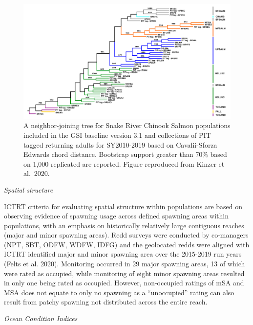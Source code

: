\documentclass[
  letterpaper,
  oneside,
  open=any]{scrbook}
\begin{document}
\begin{figure}

{\centering \includegraphics[width=7.88in,height=\textheight]{content/Interior_Columbia/../../media/image24.png}

}

\caption{\label{fig-SnR-SS-neighbor-joining-tree}A neighbor-joining tree
for Snake River Chinook Salmon populations included in the GSI baseline
version 3.1 and collections of PIT tagged returning adults for
SY2010-2019 based on Cavalii-Sforza Edwards chord distance. Bootstrap
support greater than 70\% based on 1,000 replicated are reported. Figure
reproduced from Kinzer et al.~2020.}

\end{figure}

\emph{Spatial structure}

ICTRT criteria for evaluating spatial structure within populations are
based on observing evidence of spawning usage across defined spawning
areas within populations, with an emphasis on historically relatively
large contiguous reaches (major and minor spawning areas). Redd surveys
were conducted by co-managers (NPT, SBT, ODFW, WDFW, IDFG) and the
geolocated redds were aligned with ICTRT identified major and minor
spawning area over the 2015-2019 run years (Felts et al. 2020).
Monitoring occurred in 29 major spawning areas, 13 of which were rated
as occupied, while monitoring of eight minor spawning areas resulted in
only one being rated as occupied. However, non-occupied ratings of mSA
and MSA does not equate to only no spawning as a ``unoccupied'' rating
can also result from patchy spawning not distributed across the entire
reach.

\emph{Ocean Condition Indices}
\end{document}
